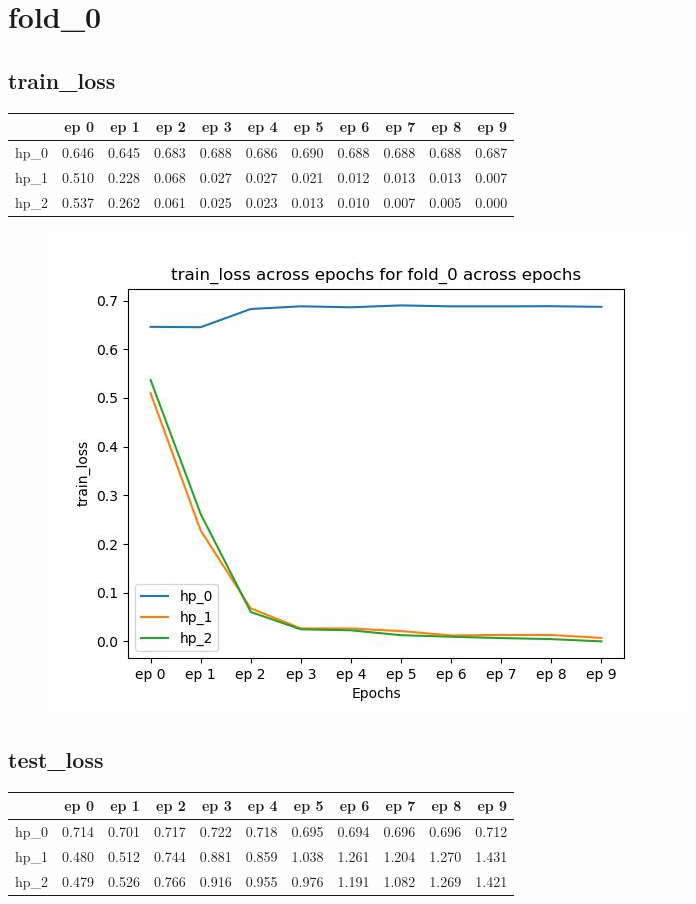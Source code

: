 \documentclass{article}
\begin{document}
\section{fold\_0}
\subsection{train\_loss}
\begin{tabular}{lrrrrrrrrrr}
\toprule
{} &   ep 0 &   ep 1 &   ep 2 &   ep 3 &   ep 4 &   ep 5 &   ep 6 &   ep 7 &   ep 8 &   ep 9 \\
\midrule
hp\_0 &  0.646 &  0.645 &  0.683 &  0.688 &  0.686 &  0.690 &  0.688 &  0.688 &  0.688 &  0.687 \\
hp\_1 &  0.510 &  0.228 &  0.068 &  0.027 &  0.027 &  0.021 &  0.012 &  0.013 &  0.013 &  0.007 \\
hp\_2 &  0.537 &  0.262 &  0.061 &  0.025 &  0.023 &  0.013 &  0.010 &  0.007 &  0.005 &  0.000 \\
\bottomrule
\end{tabular}

\begin{figure}[H]
\includegraphics[scale = 0.75]{fold_0/train_loss}
\end{figure}
\subsection{test\_loss}
\begin{tabular}{lrrrrrrrrrr}
\toprule
{} &   ep 0 &   ep 1 &   ep 2 &   ep 3 &   ep 4 &   ep 5 &   ep 6 &   ep 7 &   ep 8 &   ep 9 \\
\midrule
hp\_0 &  0.714 &  0.701 &  0.717 &  0.722 &  0.718 &  0.695 &  0.694 &  0.696 &  0.696 &  0.712 \\
hp\_1 &  0.480 &  0.512 &  0.744 &  0.881 &  0.859 &  1.038 &  1.261 &  1.204 &  1.270 &  1.431 \\
hp\_2 &  0.479 &  0.526 &  0.766 &  0.916 &  0.955 &  0.976 &  1.191 &  1.082 &  1.269 &  1.421 \\
\bottomrule
\end{tabular}
\end{document}
